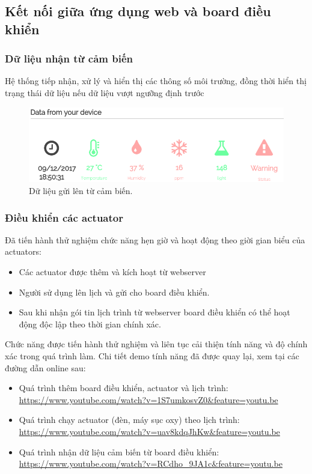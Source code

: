 \documentclass[a4paper,12pt,oneside]{article}
\begin{document}
\subsection{Kết nối giữa ứng dụng web và board điều khiển}

\subsubsection{Dữ liệu nhận từ cảm biến}
\noindent Hệ thống tiếp nhận, xử lý và hiển thị các thông số môi trường, đồng thời hiển thị trạng thái dữ liệu nếu dữ liệu vượt ngưỡng định trước

	\begin{figure}[H]
	\centering
	\includegraphics[scale=.7]{hinh/data.PNG}
	\caption{Dữ liệu gửi lên từ cảm biến.}
	\end{figure}
	
\subsubsection{Điều khiển các actuator}
\noindent Đã tiến hành thử nghiệm chức năng hẹn giờ và hoạt động theo giời gian biểu của actuators:
\begin{itemize}
	\item Các actuator được thêm và kích hoạt từ webserver
	\item Người sử dụng lên lịch và gửi cho board điều khiển.
	\item Sau khi nhận gói tin lịch trình từ webserver board điều khiển có thể hoạt động độc lập theo thời gian chính xác.
\end{itemize}
	
Chức năng được tiến hành thử nghiệm và liên tục cải thiện tính năng và độ chính xác trong quá trình làm. Chi tiết demo tính năng đã được quay lại, xem tại các đường dẫn online sau:

	\begin{itemize}
	\item	Quá trình thêm board điều khiển, actuator và lịch trình:\\ 
	\url{https://www.youtube.com/watch?v=1S7umkosvZ0&feature=youtu.be}

	\item	Quá trình chạy actuator (đèn, máy sục oxy) theo lịch trình:\\
	\url{https://www.youtube.com/watch?v=uav8kdqJhKw&feature=youtu.be}

	\item	Quá trình nhận dữ liệu cảm biến từ board điều khiển:\\
	\url{https://www.youtube.com/watch?v=RCdho_9JA1c&feature=youtu.be}

	\end{itemize}
\end{document}

